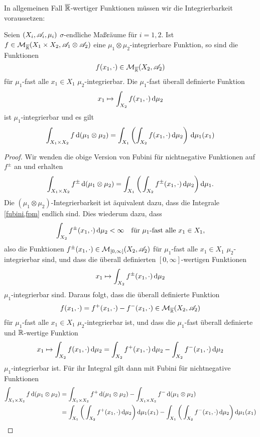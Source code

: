 In allgemeinen Fall $\ol\R$-wertiger Funktionen müssen wir die Integrierbarkeit voraussetzen:
\begin{satz}
\begin{mdframed}
Seien $(X_i,\AA_i,\mu_i)$ $\sigma$-endliche Maßräume für $i=1,2$.
Ist $f\in \MM_{\ol\R}(X_1\times X_2, \AA_1\otimes \AA_2)$ eine $\mu_1\otimes \mu_2$-integrierbare Funktion, so sind die Funktionen $$f(x_1,\cdot) \in \MM_{\ol\R}(X_2,\AA_2)$$ für $\mu_1$-fast alle $x_1 \in X_1$ $\mu_2$-integrierbar. Die $\mu_1$-fast überall definierte Funktion
$$x_1 \mapsto \int_{X_2}f(x_1,\cdot)\D\mu_2$$
ist $\mu_1$-integrierbar und es gilt
\begin{equation}
\int_{X_1\times X_2}f \D(\mu_1\otimes\mu_2) = \int_{X_1}\left(\int_{X_2}f(x_1,\cdot)\D\mu_2\right)\D\mu_1(x_1)
\end{equation}
\end{mdframed}
\begin{proof}
Wir wenden die obige Version von Fubini für nichtnegative Funktionen auf $f^\pm$ an und erhalten
\begin{equation}\label{fubini,fpm}
\int_{X_1\times X_2}f^\pm \D (\mu_1\otimes \mu_2) = \int_{X_1} \bigg(\int_{X_2}f^\pm(x_1,\cdot)\D \mu_2\bigg)\D\mu_1.
\end{equation}
Die $(\mu_1\otimes \mu_2)$-Integrierbarkeit ist äquivalent dazu, dass die Integrale \eqref{fubini,fpm} endlich sind. Dies wiederum dazu, dass
$$\int_{X_2}f^\pm(x_1,\cdot )\D\mu_2 <\infty\quad \te{für } \mu_1\te{-fast alle }x_1\in X_1,$$
also die Funktionen $f^\pm(x_1,\cdot)\in\MM_{[0,\infty]}(X_2,\AA_2)$ für $\mu_1$-fast alle $x_1\in X_1$ $\mu_2$-integrierbar sind, und dass die überall definierten $[0,\infty]$-wertigen Funktionen
$$x_1 \mapsto \int_{X_2} f^\pm(x_1,\cdot)\D\mu_2$$
$\mu_1$-integrierbar sind. Daraus folgt, dass die überall definierte Funktion
$$f(x_1,\cdot)=f^+(x_1,\cdot)-f^-(x_1,\cdot) \in \MM_{\ol\R}(X_2,\AA_2)$$
für $\mu_1$-fast alle $x_1\in X_1$ $\mu_2$-integrierbar ist, und dass die $\mu_1$-fast überall definierte und $\R$-wertige Funktion
$$x_1\mapsto \int_{X_2}f(x_1,\cdot)\D\mu_2=\int_{X_2}f^+(x_1,\cdot)\D\mu_2-\int_{X_2}f^-(x_1,\cdot)\D\mu_2$$
$\mu_1$-integrierbar ist. Für ihr Integral gilt dann mit Fubini für nichtnegative Funktionen
\begin{align*}
\int_{X_1\times X_2} f \D(\mu_1\otimes \mu_2) &= \int_{X_1\times X_2} f^+\D(\mu_1\otimes \mu_2) - \int_{X_1\times X_2} f^-\D(\mu_1\otimes\mu_2) 	\\
& = \int_{X_1}\bigg(\int_{X_2}f^+(x_1,\cdot)\D\mu_2\bigg)\D\mu_1(x_1) -\int_{X_1}\bigg(\int_{X_2}f^-(x_1,\cdot)\D\mu_2\bigg)\D\mu_1(x_1)\\

\end{align*}
\end{proof}
\end{satz}

